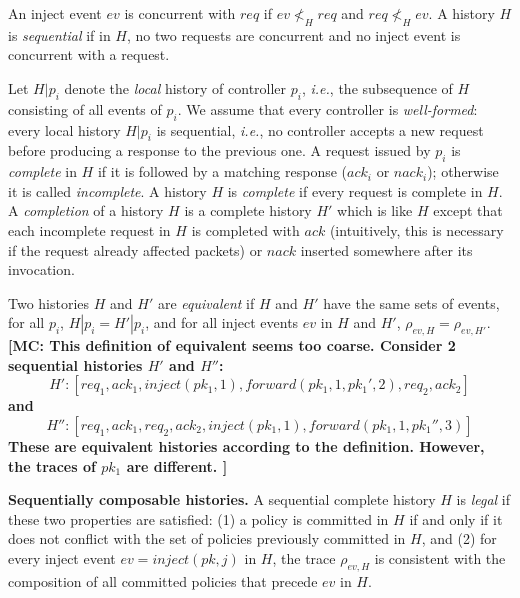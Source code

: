 \documentclass[11pt,pdftex,letter]{article}
\newcommand{\ie}{{\it i.e.}}
\newcommand{\mcnote}[1]{\textcolor{heraldBlue}{\small \bf [MC: #1]}}
\newcommand{\ssnote}[1]{\textcolor{heraldBlue}{\small \bf [SS: #1]}}
\newcommand{\mcnote}[1]{}
\newcommand{\ssnote}[1]{}
\newcommand{\ack}{\textit{ack}}
\newcommand{\nack}{\textit{nack}}
\begin{document}
An inject event $ev$ is concurrent with
$\textit{req}$ if $ev \not<_H \textit{req}$ and $\textit{req} \not<_H ev$.
A history $H$ is \emph{sequential} if in $H$, no two requests are
concurrent and no inject event is concurrent with a request.

Let $H|p_i$ denote the \emph{local} history
of controller $p_i$, \ie, the subsequence of $H$ consisting of all events
of $p_i$.
We assume that every controller is \emph{well-formed}:
every local history $H|p_i$ is sequential, \ie,
no controller accepts a new request before producing a response to the
previous one.
A request issued by $p_i$ is \emph{complete} in $H$ if it is followed by a
matching response ($\ack_i$ or $\nack_i$); %
otherwise it is called \emph{incomplete}.
A history $H$ is \emph{complete} if every request is complete in $H$.
A \emph{completion} of a history $H$ is a complete history $H'$ which is like
$H$ except that  each incomplete request in $H$
is completed with $\ack$ (intuitively, this is necessary if the
request already affected packets) or $\nack$ inserted
somewhere after its invocation.

Two histories $H$ and $H'$ are \emph{equivalent} if $H$ and $H'$ have
the same sets of events,  for all $p_i$, $H|p_i=H'|p_i$, and for all
inject events $ev$ in $H$ and $H'$, $\rho_{ev,H}=\rho_{ev,H'}$.
\mcnote{This definition of equivalent seems too coarse.
Consider 2 sequential histories $H'$ and $H''$:
$$H': [req_1, ack_1, inject(pk_1, 1), forward(pk_1, 1, pk_1', 2), req_2, ack_2]$$
and
$$H'': [req_1, ack_1, req_2, ack_2, inject(pk_1, 1), forward(pk_1, 1, pk_1'', 3)]$$
These are equivalent histories according to the definition. However, the traces of $pk_1$ are different.
}


\vspace{1mm}\noindent\textbf{Sequentially composable histories.}
A sequential complete history $H$ is \emph{legal} if these two
properties are satisfied:
(1) a policy
is committed in $H$ if and only if
it does not conflict with the set of
policies previously committed in $H$, and
(2) for every inject event
$ev=\textit{inject}(pk,j)$ in $H$,  the trace $\rho_{ev,H}$  is consistent
with the composition of all committed policies that precede
$ev$ in $H$.
\end{document}
